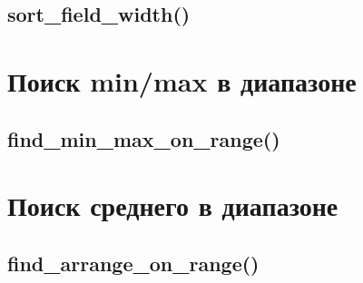 \documentclass[12pt, a4paper]{article}
\begin{document}



\subsection{sort\_field\_width()}






\section{Поиск min/max в диапазоне}


\subsection{find\_min\_max\_on\_range()}






\section{Поиск среднего в диапазоне}


\subsection{find\_arrange\_on\_range()}






\label{link:lastPage}
\end{document}
